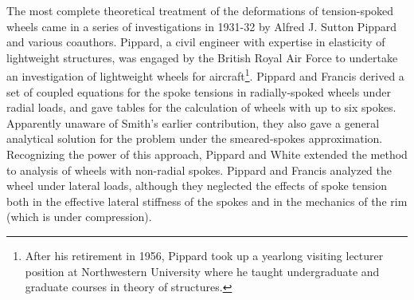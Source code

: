 \documentclass[../thesis.tex]{subfiles}
\begin{document}
The most complete theoretical treatment of the deformations of tension-spoked wheels came in a series of investigations in 1931-32 by Alfred J. Sutton Pippard and various coauthors. Pippard, a civil engineer with expertise in elasticity of lightweight structures, was engaged by the British Royal Air Force to undertake an investigation of lightweight wheels for aircraft\footnote{After his retirement in 1956, Pippard took up a yearlong visiting lecturer position at Northwestern University where he taught undergraduate and graduate courses in theory of structures.}. Pippard and Francis derived a set of coupled equations for the spoke tensions in radially-spoked wheels under radial loads, and gave tables for the calculation of wheels with up to six spokes. Apparently unaware of Smith's earlier contribution, they also gave a general analytical solution for the problem under the smeared-spokes approximation. Recognizing the power of this approach, Pippard and White extended the method to analysis of wheels with non-radial spokes. Pippard and Francis analyzed the wheel under lateral loads, although they neglected the effects of spoke tension both in the effective lateral stiffness of the spokes and in the mechanics of the rim (which is under compression).





\end{document}
